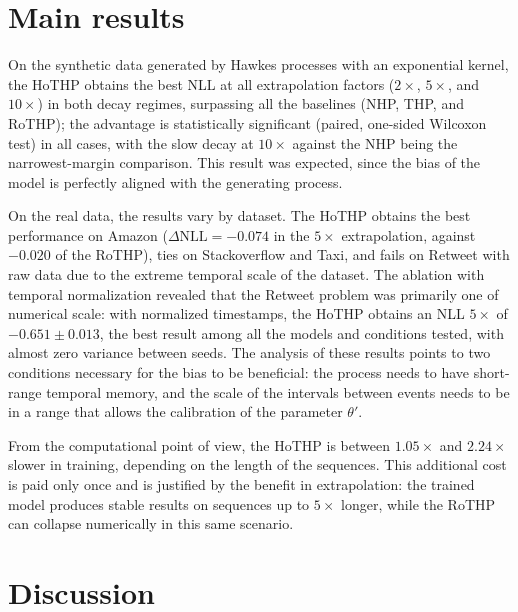 \section{Main results}

On the synthetic data generated by Hawkes processes with an exponential kernel, the HoTHP obtains the best NLL at all extrapolation factors ($2\times$, $5\times$, and $10\times$) in both decay regimes, surpassing all the baselines (NHP, THP, and RoTHP); the advantage is statistically significant (paired, one-sided Wilcoxon test) in all cases, with the slow decay at $10\times$ against the NHP being the narrowest-margin comparison. This result was expected, since the bias of the model is perfectly aligned with the generating process.

On the real data, the results vary by dataset. The HoTHP obtains the best performance on Amazon ($\Delta\text{NLL} = -0.074$ in the $5\times$ extrapolation, against $-0.020$ of the RoTHP), ties on Stackoverflow and Taxi, and fails on Retweet with raw data due to the extreme temporal scale of the dataset. The ablation with temporal normalization revealed that the Retweet problem was primarily one of numerical scale: with normalized timestamps, the HoTHP obtains an NLL $5\times$ of $-0.651 \pm 0.013$, the best result among all the models and conditions tested, with almost zero variance between seeds. The analysis of these results points to two conditions necessary for the bias to be beneficial: the process needs to have short-range temporal memory, and the scale of the intervals between events needs to be in a range that allows the calibration of the parameter $\theta'$.

From the computational point of view, the HoTHP is between $1.05\times$ and $2.24\times$ slower in training, depending on the length of the sequences. This additional cost is paid only once and is justified by the benefit in extrapolation: the trained model produces stable results on sequences up to $5\times$ longer, while the RoTHP can collapse numerically in this same scenario.

\section{Discussion}

